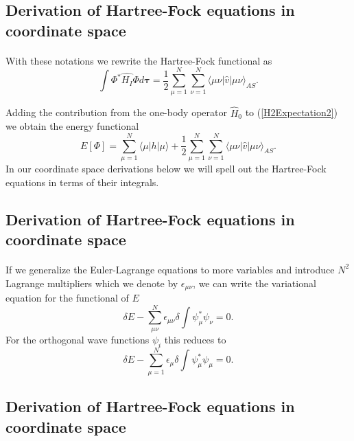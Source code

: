\documentclass[%
twoside,                 %
final,                   %
10pt]{article}
\begin{document}
\subsection{Derivation of Hartree-Fock equations in coordinate space}

\paragraph{}
With these notations we rewrite the Hartree-Fock functional as
\begin{equation}
  \int \Phi^*\hat{H_I}\Phi d\mathbf{\tau} 
  = \frac{1}{2}\sum_{\mu=1}^N\sum_{\nu=1}^N \langle \mu\nu|\hat{v}|\mu\nu\rangle_{AS}. \label{H2Expectation2}
\end{equation}

Adding the contribution from the one-body operator $\hat{H}_0$ to
(\ref{H2Expectation2}) we obtain the energy functional 
\begin{equation}
  E[\Phi] 
  = \sum_{\mu=1}^N \langle \mu | h | \mu \rangle +
  \frac{1}{2}\sum_{{\mu}=1}^N\sum_{{\nu}=1}^N \langle \mu\nu|\hat{v}|\mu\nu\rangle_{AS}. \label{FunctionalEPhi}
\end{equation}
In our coordinate space derivations below we will spell out the Hartree-Fock equations in terms of their integrals.




\subsection{Derivation of Hartree-Fock equations in coordinate space}

\paragraph{}
If we generalize the Euler-Lagrange equations to more variables 
and introduce $N^2$ Lagrange multipliers which we denote by 
$\epsilon_{\mu\nu}$, we can write the variational equation for the functional of $E$
\[
  \delta E - \sum_{\mu\nu}^N \epsilon_{\mu\nu} \delta
  \int \psi_{\mu}^* \psi_{\nu} = 0.
\]
For the orthogonal wave functions $\psi_{i}$ this reduces to
\[
  \delta E - \sum_{\mu=1}^N \epsilon_{\mu} \delta
  \int \psi_{\mu}^* \psi_{\mu} = 0.
\]



\subsection{Derivation of Hartree-Fock equations in coordinate space}
\end{document}
